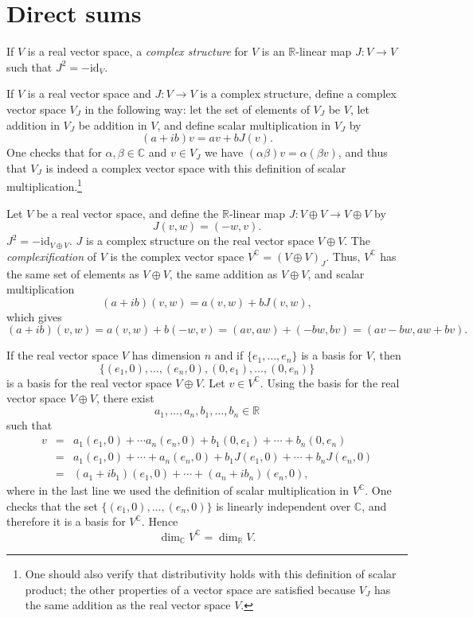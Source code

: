 \documentclass{article}
\newcommand{\id}{\textrm{id}}
\begin{document}
\section{Direct sums}
If $V$ is a real vector space, a {\em complex structure} for $V$ is an $\mathbb{R}$-linear map $J:V \to V$ such that $J^2=-\id_V$.

If $V$ is a real vector space and $J:V \to V$ is a complex structure,  define a complex vector space $V_J$ in the following way: let the set of elements of $V_J$ be $V$,
let addition in $V_J$ be addition in $V$, and define scalar multiplication in $V_J$ by 
\[
(a+ib)v=av+bJ(v).
\]
One checks that for $\alpha,\beta \in \mathbb{C}$ and $v \in V_J$ we have $(\alpha \beta)v=\alpha (\beta v)$, and thus
that $V_J$ is indeed a complex vector space with this definition of scalar multiplication.\footnote{One should also
verify that distributivity holds with this definition of scalar product; the other properties of a vector space are satisfied because $V_J$ has
the same addition as the real vector space $V$.}

 Let $V$ be a real vector space, and define the $\mathbb{R}$-linear map 
$J:V \oplus V \to V \oplus V$ by
\[
J(v,w)=(-w,v).
\]
$J^2=-\id_{V \oplus V}$. $J$ is a complex structure on the real vector space $V \oplus V$. 
The {\em complexification} of $V$
is the complex vector space $V^\mathbb{C}=(V \oplus V)_J$. 
Thus, $V^\mathbb{C}$ has the same set of elements as $V \oplus V$, the same addition as $V \oplus V$, and scalar multiplication
\[
(a+ib) (v,w)=a(v,w)+bJ(v,w),
\]
which gives
\[
(a+ib)(v,w)=a(v,w)+b(-w,v)=(av,aw)+(-bw,bv)=(av-bw,aw+bv).
\]

If the real vector space $V$ has dimension $n$ and
if $\{e_1,\ldots,e_n\}$ is a basis for $V$, then
\[
\{(e_1,0),\ldots,(e_n,0),(0,e_1),\ldots,(0,e_n)\}
\]
is a basis for the real vector space $V \oplus V$. 
Let $v \in V^\mathbb{C}$. Using the basis for the real vector space $V \oplus V$, there exist 
\[
a_1,\ldots,a_n,b_1,\ldots,b_n \in \mathbb{R}
\]
such that
\begin{eqnarray*}
v&=&a_1(e_1,0)+\cdots a_n(e_n,0)+b_1(0,e_1)+\cdots+b_n(0,e_n)\\
&=&a_1(e_1,0)+\cdots+a_n(e_n,0)+b_1J(e_1,0)+\cdots+b_n J(e_n,0)\\
&=&(a_1+ib_1)(e_1,0)+\cdots+(a_n+ib_n)(e_n,0),
\end{eqnarray*}
where in the last line we used the definition of scalar multiplication in $V^\mathbb{C}$. One checks that
the set $\{(e_1,0),\ldots,(e_n,0)\}$ is linearly independent over $\mathbb{C}$, and therefore it is a basis for $V^\mathbb{C}$. 
Hence
\[
\dim_\mathbb{C} V^\mathbb{C} = \dim_\mathbb{R} V.
\]
\end{document}

